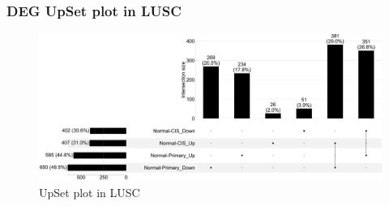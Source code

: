 \documentclass{beamer}
\begin{document}
                \begin{frame}
                    \frametitle{DEG UpSet plot in LUSC}

                    \begin{figure}
                        \includegraphics[width=0.6 \linewidth]{figures/DEG/Pair-Venn/STAR.TPM.SQC.venn.pdf}
                        \caption{UpSet plot in LUSC}
                    \end{figure}
                \end{frame}
\end{document}
